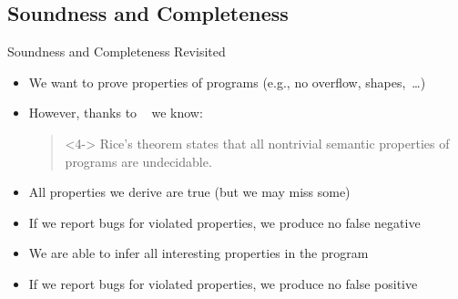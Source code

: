 \documentclass[
   aspectratio=169, %
   10pt, %
   uniqueslidenumber,
   professionalfonts
]{beamer}
\begin{document}
\subsection{Soundness and Completeness}
\newsavebox\pinguA
\savebox\pinguA{\tikz{\pingu[wings grab,eyes sad,cup=red,wool hat]}}
\begin{frame}{Soundness and Completeness Revisited}
   \begin{itemize}
      \itemsep8pt
      \item<2-> We want to prove properties of programs (e.g., no overflow, shapes,~\ldots)
      \item<3-> However, thanks to \citeauthor{rice1953classes}~\cite{rice1953classes} we know:\smallskip\\
      \begin{quote}<4->
         Rice's theorem states that all nontrivial semantic properties of programs are undecidable.~\cite[100]{cousout2021principles}
      \end{quote}
   \end{itemize}
\vspace*{-2mm}
\begin{itemize}
   \item<7-> All properties we derive are true (but we may miss some)
   \item<7-> If we report bugs for violated properties, we produce no false negative
\end{itemize}
\bigskip

\vspace*{-2mm}
\begin{itemize}
   \item<8-> We are able to infer all interesting properties in the program
   \item<8-> If we report bugs for violated properties, we produce no false positive
\end{itemize}

\end{frame}
\end{document}
